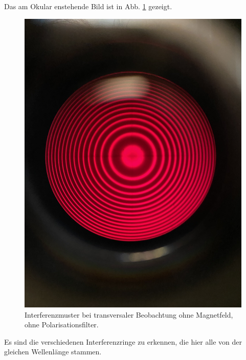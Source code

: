 \documentclass{article}
\begin{document}
\begin{multicols}{2}
Das am Okular enstehende Bild ist in Abb. \ref{fig:zeeman-transveral-ohne-ohne} gezeigt.
\begin{figure}[H]
  \centering
  \includegraphics[width=.8\linewidth]{zeeman-transversal-ohne-ohne}
  \caption{Interferenzmuster bei transversaler Beobachtung ohne Magnetfeld, ohne Polarisationsfilter.}
  \label{fig:zeeman-transveral-ohne-ohne}
\end{figure}
Es sind die verschiedenen Interferenzringe zu erkennen, die hier alle von der gleichen Wellenlänge stammen.


\end{multicols}
\end{document}
